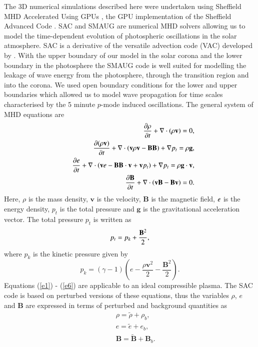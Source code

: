\documentclass[preprint,authoryear,12pt]{elsarticle}
\begin{document}
The 3D numerical simulations described here were undertaken using Sheffield MHD Accelerated Using GPUs \citep[SMAUG,][]{Griffiths2015}, the GPU implementation of the Sheffield Advanced Code \citep[SAC,][]{Shelyag2008}. SAC and SMAUG are numerical MHD solvers allowing us to model the time-dependent evolution of photospheric oscillations in the solar atmosphere. SAC is a derivative of the versatile advection code (VAC) developed by \citep{Toth1996}. With the upper boundary of our model in the solar corona and the lower boundary in the photosphere the SMAUG code is well suited for modelling the leakage of wave energy from the photosphere, through the transition region and into the corona. We used open boundary conditions for the lower and upper boundaries which allowed us to model wave propagation for time scales characterised by the 5 minute $p$-mode induced oscillations. The general system of MHD equations are
\begin{eqnarray}
&& {{\partial \rho}\over{\partial t}}+\nabla\cdot\left( \rho{\mathbf v}\right)=0, \label{e1} \\
&& {{\partial ( \rho {\bf v})}\over{\partial t}}+\nabla\cdot\left( {\bf v}\rho {\bf v}-{\bf B B}\right)+\nabla p_t=\rho{\bf g}, \label{e2}\\
&& \frac{\partial e}{\partial t}+\nabla\cdot\left({\bf v}e-{\bf B B}\cdot{\bf v}+{\bf v}p_{t}\right)+\nabla p_t=\rho{\bf g}\cdot{\bf v}, \label{e3} \\
&& {{\partial{\bf B}}\over{\partial t}} +\nabla \cdot\left(  {\bf vB}-{\bf Bv}\right)=0. \label{e4}
\end{eqnarray}
Here, $\rho$ is the mass density, $\mathbf v$ is the velocity,  $\mathbf B$ is the magnetic field, $\it{e}$ is the energy density, $p_{t}$ is the total pressure and $\mathbf g$ is the gravitational acceleration vector.
The total pressure $p_{t}$ is written as
\begin{equation}
p_{t}=p_{k}+{{\bf B}^{2}\over{2}}, \label{e5}
\end{equation}
where $p_k$ is the kinetic pressure given by
\begin{equation}
p_{k}=\left(\gamma -1\right)\left(e-\frac{\rho {\mathbf v}^{2}}{2}-\frac{{\mathbf B}^{2}}{2}\right). \label{e6}
\end{equation}
Equations (\ref{e1}) - (\ref{e6}) are applicable to an ideal compressible plasma. The SAC code is based on perturbed versions of these equations, thus the variables $\rho $, $e$ and  $\mathbf B$ are expressed in terms of perturbed and background quantities as
\begin{eqnarray}
&& \rho = \tilde{\rho}+\rho_b, \nonumber \\
&& e = \tilde{e}+e_b,  \nonumber \\
&& {\mathbf B} = \tilde{\mathbf B}+{\mathbf B}_b.  \nonumber 
\end{eqnarray}
\end{document}
